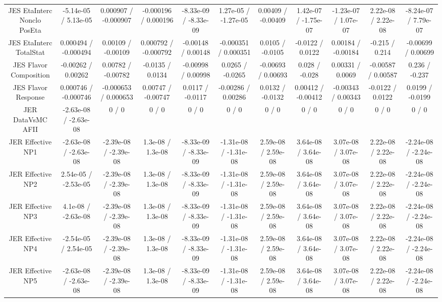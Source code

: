 {\begin{landscape}
\begin{longtable}{@{\extracolsep{\fill}}| *{11}{c|}}
  JES EtaInterc Nonclo PosEta & -5.14e-05 / 5.13e-05 & 0.000907 / -0.000907 & -0.000196 / 0.000196 & -8.33e-09 / -8.33e-09 & 1.27e-05 / -1.27e-05 & 0.00409 / -0.00409 & 1.42e-07 / -1.75e-07 & -1.23e-07 / 1.07e-07 & 2.22e-08 / 2.22e-08 & -8.24e-07 / 7.79e-07 \\ 
  JES EtaInterc TotalStat & 0.000494 / -0.000494 & 0.00109 / -0.00109 & 0.000792 / -0.000792 & -0.00148 / 0.00148 & -0.000351 / 0.000351 & 0.0105 / -0.0105 & -0.0122 / 0.0122 & 0.00184 / -0.00184 & -0.215 / 0.214 & -0.00699 / 0.00699 \\ 
  JES Flavor Composition & -0.00262 / 0.00262 & 0.00782 / -0.00782 & -0.0135 / 0.0134 & -0.00998 / 0.00998 & 0.0265 / -0.0265 & -0.00693 / 0.00693 & 0.028 / -0.028 & 0.00331 / 0.0069 & -0.00587 / 0.00587 & 0.236 / -0.237 \\ 
  JES Flavor Response & 0.000746 / -0.000746 & -0.000653 / 0.000653 & 0.00747 / -0.00747 & 0.0117 / -0.0117 & -0.00286 / 0.00286 & 0.0132 / -0.0132 & 0.00412 / -0.00412 & -0.00343 / 0.00343 & -0.0122 / 0.0122 & 0.0199 / -0.0199 \\ 
  JER DataVsMC AFII & -2.63e-08 / -2.63e-08 & 0 / 0 & 0 / 0 & 0 / 0 & 0 / 0 & 0 / 0 & 0 / 0 & 0 / 0 & 0 / 0 & 0 / 0 \\ 
  JER Effective NP1 & -2.63e-08 / -2.63e-08 & -2.39e-08 / -2.39e-08 & 1.3e-08 / 1.3e-08 & -8.33e-09 / -8.33e-09 & -1.31e-08 / -1.31e-08 & 2.59e-08 / 2.59e-08 & 3.64e-08 / 3.64e-08 & 3.07e-08 / 3.07e-08 & 2.22e-08 / 2.22e-08 & -2.24e-08 / -2.24e-08 \\ 
  JER Effective NP2 & 2.54e-05 / -2.53e-05 & -2.39e-08 / -2.39e-08 & 1.3e-08 / 1.3e-08 & -8.33e-09 / -8.33e-09 & -1.31e-08 / -1.31e-08 & 2.59e-08 / 2.59e-08 & 3.64e-08 / 3.64e-08 & 3.07e-08 / 3.07e-08 & 2.22e-08 / 2.22e-08 & -2.24e-08 / -2.24e-08 \\ 
  JER Effective NP3 & 4.1e-08 / -2.63e-08 & -2.39e-08 / -2.39e-08 & 1.3e-08 / 1.3e-08 & -8.33e-09 / -8.33e-09 & -1.31e-08 / -1.31e-08 & 2.59e-08 / 2.59e-08 & 3.64e-08 / 3.64e-08 & 3.07e-08 / 3.07e-08 & 2.22e-08 / 2.22e-08 & -2.24e-08 / -2.24e-08 \\ 
  JER Effective NP4 & -2.54e-05 / 2.54e-05 & -2.39e-08 / -2.39e-08 & 1.3e-08 / 1.3e-08 & -8.33e-09 / -8.33e-09 & -1.31e-08 / -1.31e-08 & 2.59e-08 / 2.59e-08 & 3.64e-08 / 3.64e-08 & 3.07e-08 / 3.07e-08 & 2.22e-08 / 2.22e-08 & -2.24e-08 / -2.24e-08 \\ 
  JER Effective NP5 & -2.63e-08 / -2.63e-08 & -2.39e-08 / -2.39e-08 & 1.3e-08 / 1.3e-08 & -8.33e-09 / -8.33e-09 & -1.31e-08 / -1.31e-08 & 2.59e-08 / 2.59e-08 & 3.64e-08 / 3.64e-08 & 3.07e-08 / 3.07e-08 & 2.22e-08 / 2.22e-08 & -2.24e-08 / -2.24e-08 \\ 

\end{longtable}
\end{landscape}}
